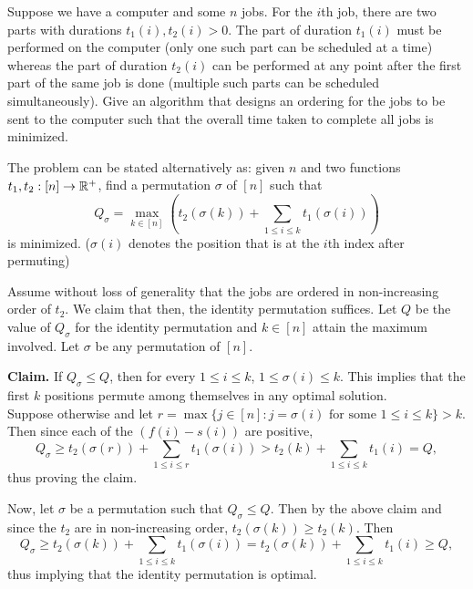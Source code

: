 \begin{exercise}
	Suppose we have a computer and some $n$ jobs. For the $i$th job, there are two parts with durations $t_{1}(i),t_{2}(i)>0$. The part of duration $t_{1}(i)$ must be performed on the computer (only one such part can be scheduled at a time) whereas the part of duration $t_{2}(i)$ can be performed at any point after the first part of the same job is done (multiple such parts can be scheduled simultaneously). Give an algorithm that designs an ordering for the jobs to be sent to the computer such that the overall time taken to complete all jobs is minimized.
\end{exercise}
\begin{solution*}
	The problem can be stated alternatively as: given $n$ and two functions $t_1,t_2:[n]\to\mathbb{R}^+$, find a permutation $\sigma$ of $[n]$ such that
	\[ Q_\sigma = \max_{k\in[n]} \left(t_2(\sigma(k)) + \sum_{1\leq i\leq k} t_1(\sigma(i))\right) \]
	is minimized. ($\sigma(i)$ denotes the position that is at the $i$th index after permuting)

	Assume without loss of generality that the jobs are ordered in non-increasing order of $t_2$. We claim that then, the identity permutation suffices. Let $Q$ be the value of $Q_\sigma$ for the identity permutation and $k\in[n]$ attain the maximum involved. Let $\sigma$ be any permutation of $[n]$.

	\textbf{Claim.} If $Q_\sigma\leq Q$, then for every $1\leq i\leq k$, $1\leq\sigma(i)\leq k$. This implies that the first $k$ positions permute among themselves in any optimal solution.\\
	Suppose otherwise and let $r=\max\{j\in[n] : j=\sigma(i)\text{ for some }1\leq i\leq k\}> k$. Then since each of the $(f(i)-s(i))$ are positive,
	\[ Q_\sigma \geq t_2(\sigma(r)) + \sum_{1\leq i\leq r} t_1(\sigma(i)) > t_2(k) + \sum_{1\leq i\leq k}t_1(i) = Q, \]
	thus proving the claim.

	Now, let $\sigma$ be a permutation such that $Q_\sigma \leq Q$. Then by the above claim and since the $t_2$ are in non-increasing order, $t_2(\sigma(k))\geq t_2(k)$. Then
	\[ Q_\sigma \geq t_2(\sigma(k)) + \sum_{1\leq i\leq k} t_1(\sigma(i)) = t_2(\sigma(k)) + \sum_{1\leq i\leq k} t_1(i) \geq Q, \]
	thus implying that the identity permutation is optimal. 
\end{solution*}

